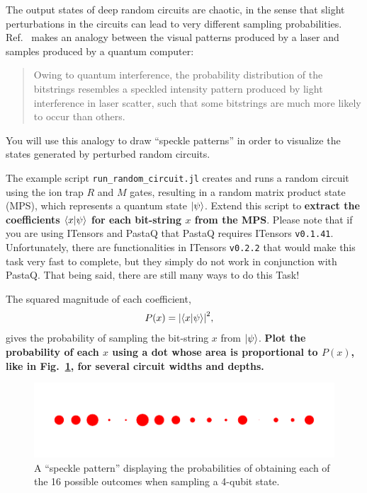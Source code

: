 \documentclass[12pt]{article}
\begin{document}
The output states of deep random circuits are chaotic, in the sense that slight perturbations in the circuits can lead to very different sampling probabilities.
Ref.~ makes an analogy between the visual patterns produced by a laser and samples produced by a quantum computer:
\begin{quote}
Owing to quantum interference, the probability distribution of the bitstrings resembles a speckled intensity pattern produced by light interference in laser scatter, such that some bitstrings are much more likely to occur than others.
\end{quote}
You will use this analogy to draw ``speckle patterns'' in order to visualize the states generated by perturbed random circuits.

The example script \texttt{run\_random\_circuit.jl} creates and runs a random circuit using the ion trap $R$ and $M$ gates, resulting in a random matrix product state (MPS), which represents a quantum state $\ket{\psi}$.
Extend this script to \textbf{extract the coefficients $\ip{x}{\psi}$ for each bit-string $x$ from the MPS}.
Please note that if you are using ITensors and PastaQ that PastaQ requires ITensors \texttt{v0.1.41}.
Unfortunately, there are functionalities in ITensors \texttt{v0.2.2} that would make this task very fast to complete, but they simply do not work in conjunction with PastaQ.
That being said, there are still many ways to do this Task!


The squared magnitude of each coefficient,
\begin{align}
	P(x)
	&= \abs{\ip{x}{\psi}}^2,
\end{align}
gives the probability of sampling the bit-string $x$ from $\ket{\psi}$.
\textbf{Plot the probability of each $x$ using a dot whose area is proportional to $P(x)$, like in Fig.~\ref{fig:speckle}, for several circuit widths and depths.}

\begin{figure}
	\centering
	\includegraphics{images/speckle_N=004,depth=032}
	\caption{
		A ``speckle pattern'' displaying the probabilities of obtaining each of the 16 possible outcomes when sampling a 4-qubit state.
	}
	\label{fig:speckle}
\end{figure}
\end{document}
